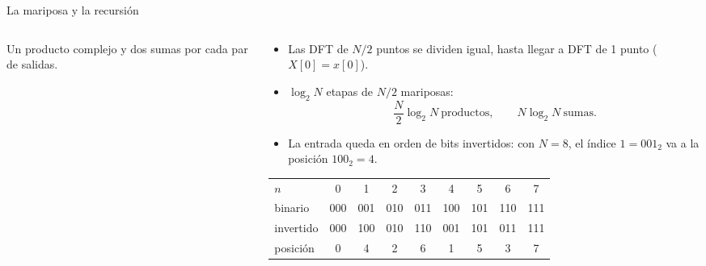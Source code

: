 \documentclass[aspectratio=169,11pt]{beamer}
\begin{document}
\begin{frame}{La mariposa y la recursión}
  \begin{columns}[c]
    \begin{column}{0.4\textwidth}
      \begin{center}
      \end{center}
      \small Un producto complejo y dos sumas por cada par de salidas.
    \end{column}
    \begin{column}{0.58\textwidth}
      \begin{itemize}
        \item Las DFT de $N/2$ puntos se dividen igual, hasta llegar a DFT de 1 punto ($X[0]=x[0]$).
        \item $\log_2N$ etapas de $N/2$ mariposas:
        \[
          \frac N2\log_2N\ \text{productos},\qquad N\log_2N\ \text{sumas}.
        \]
        \item La entrada queda en \alert{orden de bits invertidos}: con $N=8$, el índice $1=001_2$ va a la posición $100_2=4$.
      \end{itemize}
      \footnotesize
      \begin{center}
        \begin{tabular}{@{}lcccccccc@{}}
          \toprule
          $n$ & 0&1&2&3&4&5&6&7\\
          binario & 000&001&010&011&100&101&110&111\\
          invertido & 000&100&010&110&001&101&011&111\\
          posición & 0&4&2&6&1&5&3&7\\\bottomrule
        \end{tabular}
      \end{center}
    \end{column}
  \end{columns}
\end{frame}
\end{document}
